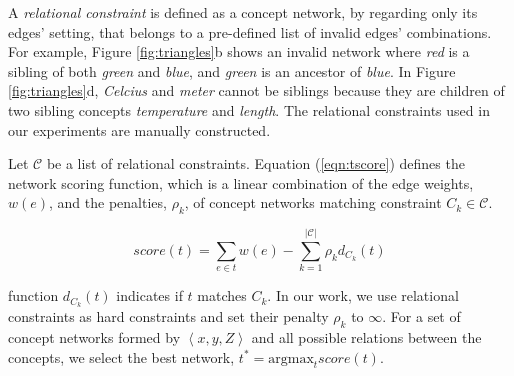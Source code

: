 %

A {\em relational constraint} is defined as a concept network, by
regarding only its edges' setting, that belongs to a pre-defined list
of invalid edges' combinations. For example, Figure
\ref{fig:triangles}b shows an invalid network where {\em red} is a
sibling of both {\em green} and {\em blue}, and {\em green} is an
ancestor of {\em blue}. In Figure \ref{fig:triangles}d, {\em Celcius}
and {\em meter} cannot be siblings because they are children of two
sibling concepts {\em temperature} and {\em length}. The relational
constraints used in our experiments are manually constructed.


Let $\mathcal{C}$ be a list of relational constraints. Equation (\ref{eqn:tscore}) defines the network scoring function,
which is a linear combination of the edge weights, $w(e)$, and the
penalties, $\rho_k$, of concept networks matching constraint $C_k \in
\mathcal{C}$.

\begin{equation}
  \label{eqn:tscore}
  score(t) = \sum_{e \in t} w(e) - \sum_{k=1}^{|\mathcal{C}|} \rho_{k} d_{C_k}(t)
\end{equation}

function $d_{C_k}(t)$ indicates if $t$ matches $C_k$. In our work, we
use relational constraints as hard constraints and set their penalty
$\rho_k$ to $\infty$. For a set of concept networks formed by $\left <
  x, y, Z \right >$ and all possible relations between the concepts,
we select the best network, $t^* = \text{argmax}_tscore(t)$.

